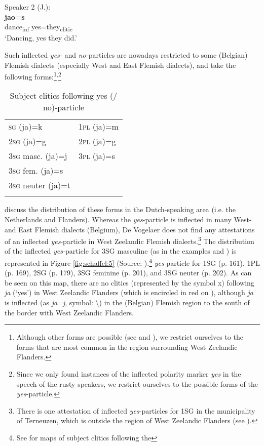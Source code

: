 \documentclass[output=paper,hidelinks,draftmode]{langscibook}
\begin{document}
\medskip

 Speaker 2 (J.): \\
 \textbf{jao=s}\\
dance\textsubscript{inf} yes=they\textsubscript{clitic}\\
\glt ‘Dancing, yes they did.’
\z 


Such inflected \textit{yes-} and \textit{no-}particles are nowadays restricted to some (Belgian) Flemish dialects \citep{Paardekooper1993} (especially West and East Flemish dialects), and take the following forms:\footnote{Although other forms are possible (see \citealt{Paardekooper1993} and \citealt[161, 168--170, 179--180, 195--197, 201--202]{DeVogelaerDevos2008}), we restrict ourselves to the forms that are most common in the region surrounding West Zeelandic Flanders.}\textsuperscript{,}\footnote{ {Since we only found instances of the inflected polarity marker} {\textit{yes}} {in the speech of the rusty speakers, we restrict ourselves to the possible forms of the} {\textit{yes}}{{}-particle.}}



\begin{table}
	\caption{Subject clitics following yes (/ no)-particle}
	\label{tab:schaffel:1}
\begin{tabularx}{.5\textwidth}{Xl}
\lsptoprule
1\textsc{sg}   (ja)=k& 1\textsc{pl}  (ja)=m\\
2\textsc{sg}    (ja)=g& 2\textsc{pl}  (ja)=g\\
3\textsc{sg} masc.  (ja)=j& 3\textsc{pl}  (ja)=s\\
3\textsc{sg} fem.  (ja)=s & ~ \\
3\textsc{sg} neuter  (ja)=t & ~ \\
\lspbottomrule
\end{tabularx}
\end{table}

%
\citet{DeVogelaerDevos2008} discuss the distribution of these forms in the Dutch-speaking area (i.e. the Netherlands and Flanders). Whereas the \textit{yes}{}-particle is inflected in many West- and East Flemish dialects (Belgium), De Vogelaer does not find any attestations of an inflected \textit{yes}-particle in West Zeelandic Flemish dialects.\footnote{There
is one attestation of inflected \textit{yes}-particles for 1SG in the municipality of Terneuzen, which is outside the region of West Zeelandic Flanders (see \citealt[161]{DeVogelaer2008}).} The distribution of the inflected \textit{yes-}particle for 3SG masculine (as in the examples  and ) is represented in Figure \ref{fig:schaffel:5} (Source: \citealt[196]{DeVogelaerDevos2008}).\footnote{See \citet{DeVogelaer2008} for maps of subject clitics following the} {\textit{yes}}{{}-particle for 1SG (p. 161), 1PL (p. 169), 2SG (p. 179), 3SG feminine (p. 201), and 3SG neuter (p. 202).} As can be seen on this map, there are no clitics (represented by the symbol x) following \textit{ja} (‘yes’) in West Zeelandic Flanders (which is encircled in red on ), although \textit{ja} is inflected (as \textit{ja=j}, symbol: {\textbackslash}) in the (Belgian) Flemish region to the south of the border with West Zeelandic Flanders.
%
\end{document}
